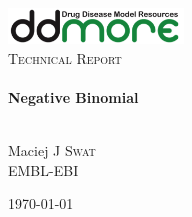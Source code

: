 \begin{titlepage}
\begin{center}

\includegraphics[width=0.35\textwidth]{./logo/ddmore_logo}~\\[1cm]

%
\textsc{\Large Technical Report}\\[0.5cm]

\HRule \\[0.4cm]
{ \huge \bfseries Negative Binomial \\[0.4cm] }

\HRule \\[1.5cm]

Maciej J \textsc{Swat}\\
EMBL-EBI


\vfill

{\large \today \\}

\end{center}
\end{titlepage}